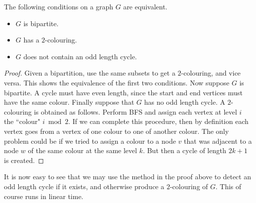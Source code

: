 \begin{Theorem} 
The following conditions on a graph $G$ are equivalent.
\begin{itemize}
  \item $G$ is bipartite.
  \item $G$ has a $2$-colouring.
  \item $G$ does not contain an odd length cycle.
\end{itemize}
\end{Theorem}
\begin{proof} 
Given a bipartition, use the same subsets to get a $2$-colouring, and
vice versa. This shows the equivalence of the first two conditions. Now
suppose $G$ is bipartite.  A cycle must have even length, since the start
and end vertices must have the same colour. Finally suppose that $G$
has no odd length cycle. A $2$-colouring is obtained as follows. Perform
BFS and assign each vertex at level $i$ the ``colour" $i \bmod 2$. If we
can complete this procedure, then by definition each vertex goes from
a vertex of one colour to one of another colour. The only problem could
be if we tried to assign a colour to a node $v$ that was adjacent to a
node $w$ of the same colour at the same level $k$. But then a cycle of
length $2k+1$ is created.
\end{proof}

It is now easy to see that we may use the method in the proof above
to detect an odd length cycle if it exists, and otherwise produce a
$2$-colouring of $G$. This of course runs in linear time.


